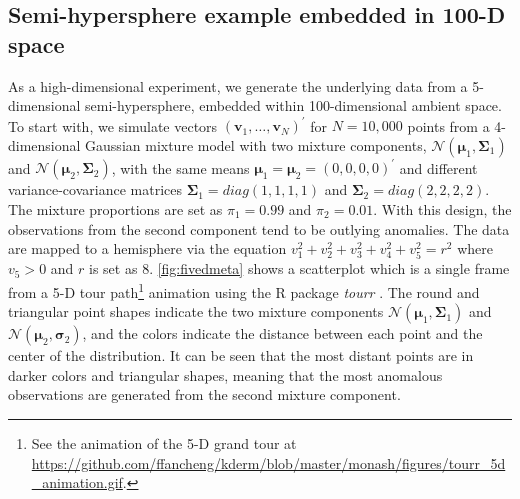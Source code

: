 \documentclass[12pt]{article}
\begin{document}
\hypertarget{fivedgaussian}{%
\subsection{Semi-hypersphere example embedded in 100-D space}\label{fivedgaussian}}

As a high-dimensional experiment, we generate the underlying data from a 5-dimensional semi-hypersphere, embedded within 100-dimensional ambient space. To start with, we simulate vectors \((\bm{v}_1, \dots, \bm{v}_N)^\prime\) for \(N=10,000\) points from a 4-dimensional Gaussian mixture model with two mixture components, \(\mathcal{N}(\bm{\mu}_1, \bm{\Sigma}_1)\) and \(\mathcal{N}(\bm{\mu}_2, \bm{\Sigma}_2)\), with the same means \(\bm{\mu}_1 = \bm{\mu}_2 =(0, 0, 0, 0)^\prime\) and different variance-covariance matrices \(\bm{\Sigma}_1 = diag(1,1,1,1)\) and \(\bm{\Sigma}_2 = diag(2,2,2,2)\). The mixture proportions are set as \(\pi_1=0.99\) and \(\pi_2=0.01\). With this design, the observations from the second component tend to be outlying anomalies. The data are mapped to a hemisphere via the equation
\(v_1^2 + v_2^2 + v_3^2 + v_4^2 + v_5^2 = r^2\) where \(v_5>0\) and \(r\) is set as \(8\).
\autoref{fig:fivedmeta} shows a scatterplot which is a single frame from a 5-D tour path\footnote{See the animation of the 5-D grand tour at \url{https://github.com/ffancheng/kderm/blob/master/monash/figures/tourr_5d_animation.gif}.} animation using the R package \emph{tourr} \autocite{Wickham2011-ir}. The round and triangular point shapes indicate the two mixture components \(\mathcal{N}(\bm{\mu}_1, \bm{\Sigma}_1)\) and
\(\mathcal{N}(\bm{\mu}_2, \bm{\sigma}_2)\), and the colors indicate the distance between each point and the center of the distribution. It can be seen that the most distant points are in darker colors and triangular shapes, meaning that the most anomalous observations are generated from the second mixture component.
\end{document}
